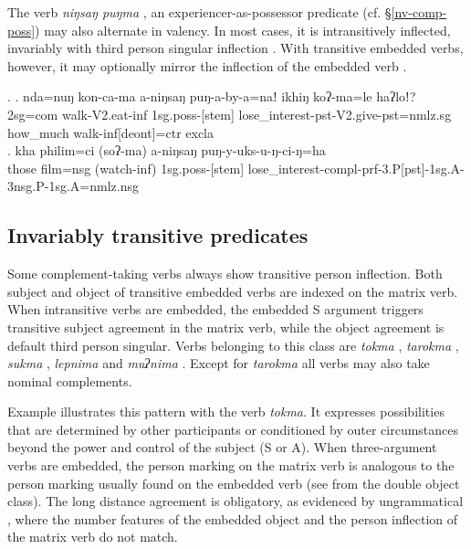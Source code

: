 The  verb \emph{niŋsaŋ puŋma} , an experiencer-as-possessor predicate (cf. §\ref{nv-comp-poss}) may also alternate in valency. In most cases, it is intransitively inflected, invariably with third person singular inflection \Next[a]. With transitive embedded verbs, however, it may optionally mirror the inflection of the embedded verb  \Next[b]. 

\ex. \ag. nda=nuŋ kon-ca-ma a-niŋsaŋ puŋ-a-by-a=naǃ ikhiŋ koʔ-ma=le haʔloǃ? \\
	{\sc 2sg=com} walk{\sc -V2.eat-inf} {\sc 1sg.poss-[stem]}  lose\_interest{\sc [3sg]-pst-V2.give-pst=nmlz.sg} how\_much walk{\sc -inf[deont]=ctr}  {\sc excla}\\
	\bg. kha philim=ci (soʔ-ma) a-niŋsaŋ puŋ-y-uks-u-ŋ-ci-ŋ=ha\\
		{\sc those} film{\sc =nsg} (watch{\sc -inf}) {\sc 1sg.poss-[stem]} lose\_interest{\sc -compl-prf-3.P[pst]-1sg.A-3nsg.P-1sg.A=nmlz.nsg}	\\
 


\subsection{Invariably transitive predicates}

Some complement-taking verbs always show transitive person inflection. Both subject and object of transitive embedded verbs are indexed on the matrix verb. When intransitive verbs are embedded, the embedded S argument triggers transitive subject agreement in the matrix verb, while the object agreement is default third person singular. Verbs belonging to this class are  \emph{tokma} , \emph{tarokma} , \emph{sukma} ,  \emph{lepnima}  and \emph{muʔnima} . Except for \emph{tarokma} all verbs may also take nominal complements. 

Example \Next illustrates this pattern with the verb \emph{tokma}. It expresses possibilities that are determined by other participants or conditioned by outer circumstances beyond the power and control of the subject (S or A). When three-argument verbs are embedded,  the person marking on the matrix verb is analogous to the person marking usually found on  the embedded verb (see \Next[b] from the double object class). The long distance agreement is obligatory, as evidenced by ungrammatical \Next[c], where the number features of the embedded object and the person inflection of the matrix verb do not match. 

